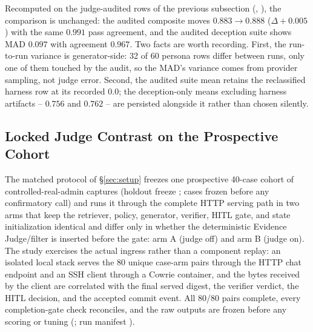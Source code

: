 Recomputed on the judge-audited rows of the previous subsection
(, ), the
comparison is unchanged: the audited composite moves $0.883\to0.888$
($\Delta+0.005$) with the same $0.991$ pass agreement, and the audited
deception suite shows MAD $0.097$ with agreement $0.967$. Two facts are
worth recording. First, the run-to-run variance is generator-side: 32
of 60 persona rows differ between runs, only one of them touched by the
audit, so the MAD's variance comes from provider sampling, not judge
error. Second, the audited suite mean retains the reclassified harness
row at its recorded 0.0; the deception-only means excluding harness
artifacts -- $0.756$ and $0.762$ -- are persisted alongside it rather
than chosen silently.

\ifdefined\SPSubmission
\else

\subsection{Locked Judge Contrast on the Prospective Cohort}
\label{sec:judge-contrast}

The matched protocol of \S\ref{sec:setup} freezes one prospective
40-case cohort of controlled-real-admin captures (holdout freeze
;
cases frozen before any confirmatory call) and runs it through the
complete HTTP serving path in two arms that keep the retriever, policy,
generator, verifier, HITL gate, and state initialization identical and
differ only in whether the deterministic Evidence Judge/filter is
inserted before the gate: arm A (judge off) and arm B (judge on). The
study exercises the actual ingress rather than a component replay: an
isolated local stack serves the 80 unique case-arm pairs through the HTTP
chat endpoint and an SSH client through a Cowrie container, and the
bytes received by the client are correlated with the final served digest,
the verifier verdict, the HITL decision, and the accepted commit event.
All 80/80 pairs complete, every completion-gate check reconciles, and the
raw outputs are frozen before any scoring or tuning
(;
run manifest ).

